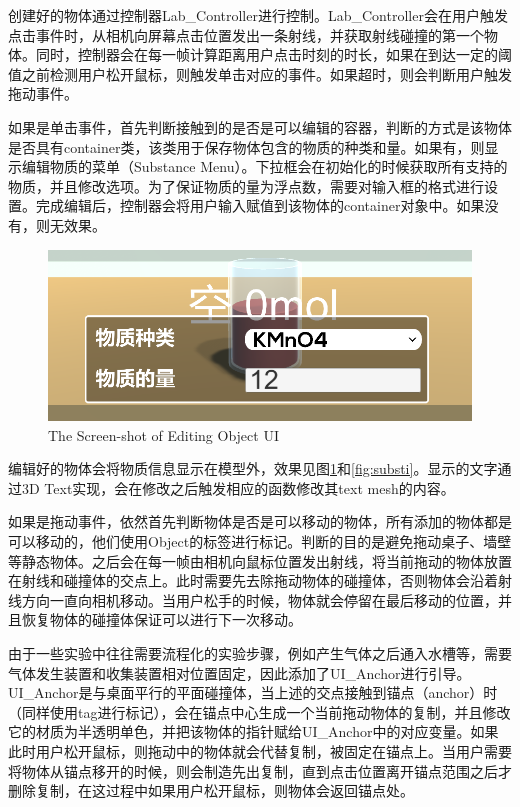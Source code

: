 	创建好的物体通过控制器Lab\_Controller进行控制。Lab\_Controller会在用户触发点击事件时，从相机向屏幕点击位置发出一条射线，并获取射线碰撞的第一个物体。同时，控制器会在每一帧计算距离用户点击时刻的时长，如果在到达一定的阈值之前检测用户松开鼠标，则触发单击对应的事件。如果超时，则会判断用户触发拖动事件。

	如果是单击事件，首先判断接触到的是否是可以编辑的容器，判断的方式是该物体是否具有container类，该类用于保存物体包含的物质的种类和量。如果有，则显示编辑物质的菜单（Substance Menu）。下拉框会在初始化的时候获取所有支持的物质，并且修改选项。为了保证物质的量为浮点数，需要对输入框的格式进行设置。完成编辑后，控制器会将用户输入赋值到该物体的container对象中。如果没有，则无效果。
	
\begin{figure}[!htp]
  \centering
  \includegraphics[width=12cm]{figure/subs.png}
    {The Screen-shot of Editing Object UI}
 \label{fig:subs}
\end{figure}

编辑好的物体会将物质信息显示在模型外，效果见图\ref{fig:subs}和\ref{fig:substi}。显示的文字通过3D Text实现，会在修改之后触发相应的函数修改其text mesh的内容。

如果是拖动事件，依然首先判断物体是否是可以移动的物体，所有添加的物体都是可以移动的，他们使用Object的标签进行标记。判断的目的是避免拖动桌子、墙壁等静态物体。之后会在每一帧由相机向鼠标位置发出射线，将当前拖动的物体放置在射线和碰撞体的交点上。此时需要先去除拖动物体的碰撞体，否则物体会沿着射线方向一直向相机移动。当用户松手的时候，物体就会停留在最后移动的位置，并且恢复物体的碰撞体保证可以进行下一次移动。

由于一些实验中往往需要流程化的实验步骤，例如产生气体之后通入水槽等，需要气体发生装置和收集装置相对位置固定，因此添加了UI\_Anchor进行引导。UI\_Anchor是与桌面平行的平面碰撞体，当上述的交点接触到锚点（anchor）时（同样使用tag进行标记），会在锚点中心生成一个当前拖动物体的复制，并且修改它的材质为半透明单色，并把该物体的指针赋给UI\_Anchor中的对应变量。如果此时用户松开鼠标，则拖动中的物体就会代替复制，被固定在锚点上。当用户需要将物体从锚点移开的时候，则会制造先出复制，直到点击位置离开锚点范围之后才删除复制，在这过程中如果用户松开鼠标，则物体会返回锚点处。
	
